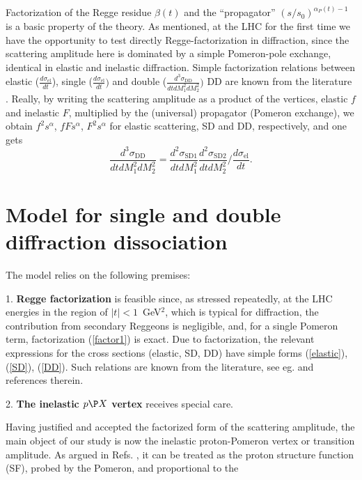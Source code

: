\documentclass[12pt]{article}
\begin{document}
Factorization of the Regge residue $\beta(t)$ and the ``propagator'' $(s/s_0)^{\alpha_P(t)-1}$ is a basic property of the theory. As mentioned, at the LHC for the first time
we have the opportunity to test directly Regge-factorization  in diffraction, since the scattering amplitude here is dominated by a simple Pomeron-pole exchange, identical in elastic and inelastic diffraction.
Simple factorization relations between elastic ($\frac{d\sigma_\mathrm{el}}{dt}$), single ($\frac{d\sigma_\mathrm{el}}{dt})$ and double ($\frac{d^3\sigma_\mathrm{DD}}{dtdM_1^2dM_2^2})$ DD are known from the literature \cite{Goulianos}.
Really, by writing the scattering amplitude as a product of the vertices, elastic $f$ and inelastic $F$, multiplied by the (universal) propagator (Pomeron exchange), we obtain $f^2s^{\alpha}$, $fFs^{\alpha}$, $F^2s^{\alpha}$ for elastic scattering, SD and DD, respectively, and one gets
\begin{equation}\label{factor1}
\frac{d^3\sigma_\mathrm{DD}}{dtdM_1^2dM_2^2}=\frac{d^2\sigma_\mathrm{SD1}}{dtdM_1^2}\frac{d^2\sigma_\mathrm{SD2}}{dtdM_2^2}/\frac{d\sigma_\mathrm{el}}{dt}.
\end{equation}

\section{Model for single and double diffraction dissociation}\label{sec:Model}
The model relies on the following premises:

1.  {\bf Regge factorization} is feasible since, as stressed repeatedly, at the LHC energies in the region of $|t|<1$~GeV$^2$, which is typical for diffraction, the contribution from secondary Reggeons is negligible, and, for a single Pomeron term, factorization (\ref{factor1}) is exact. Due to factorization, the relevant expressions for the cross sections (elastic, SD, DD) have simple forms (\ref{elastic}), (\ref{SD}), (\ref{DD}). Such relations are known from the literature, see eg. \cite{Goulianos, Chew:1974zy,Chew:1974vu} and references therein.

2. {\bf The inelastic $p\P X$ vertex} receives special care.

Having justified and accepted the factorized form of the scattering amplitude,
the main object of our study is now the inelastic proton-Pomeron vertex or transition amplitude.
As argued in Refs. \cite{JL,PR}, it can be treated as the proton structure function (SF), probed by the Pomeron, and proportional to the
\end{document}
